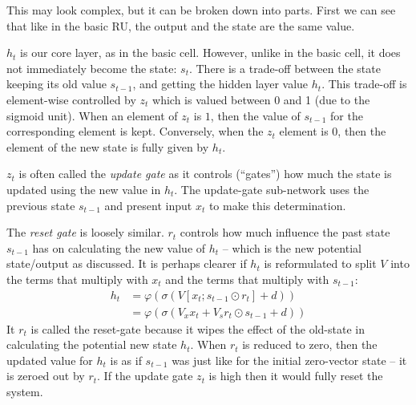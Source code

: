 \documentclass[12pt,parskip]{komatufte}\right
\begin{document}

This may look complex, but it can be broken down into parts.
First we can see that like in the basic RU, the output and the state are the same value.

$h_t$ is our core layer, as in the basic cell.
However, unlike in the basic cell, it does not immediately become the state: $s_t$.
There is a trade-off between the state keeping its old value $s_{t-1}$, and getting the hidden layer value $h_t$.
This trade-off is element-wise controlled by $z_t$ which is valued between 0 and 1 (due to the sigmoid unit).
When an element of $z_t$ is $1$, then the value of $s_{t-1}$ for the corresponding element is kept.
Conversely, when the $z_t$ element is $0$,  then the element of the new state is fully given by $h_t$.

$z_t$ is often called the \emph{update gate} as it controls (``gates'') how much the state is updated using the new value in $h_t$.
The update-gate sub-network uses the previous state $s_{t-1}$ and present input $x_t$ to make this determination.


The \emph{reset gate} is loosely similar.
$r_t$ controls how much influence the past state $s_{t-1}$ has on calculating the new value of $h_t$ -- which is the new potential state/output as discussed.
It is perhaps clearer if $h_t$ is reformulated to split $V$ into the terms that multiply with $x_t$ and the terms that multiply with $s_{t-1}$:
%
\begin{align}
h_t &= \varphi \left( \sigma \left( V[x_t; s_{t-1} \odot r_t] + d \right) \right) \\
&= \varphi \left( \sigma \left( V_x x_t + V_s r_t \odot s_{t-1} + d \right) \right)
\end{align}
%
It $r_t$ is called the reset-gate because it wipes the effect of the old-state in calculating the potential new state $h_t$.
When $r_t$ is reduced to zero, then the updated value for $h_t$ is as if $s_{t-1}$ was just like for the initial zero-vector state -- it is zeroed out by $r_t$.
If the update gate $z_t$ is high then it would fully reset the system.
\end{document}
